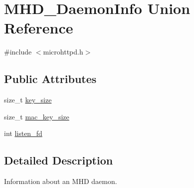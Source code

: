 \hypertarget{unionMHD__DaemonInfo}{\section{\-M\-H\-D\-\_\-\-Daemon\-Info \-Union \-Reference}
\label{unionMHD__DaemonInfo}
}


{\ttfamily \#include $<$microhttpd.\-h$>$}

\subsection*{\-Public \-Attributes}
\begin{DoxyCompactItemize}
\item 
size\-\_\-t \hyperlink{unionMHD__DaemonInfo_aebd8c774d3a7e77d359b0603f4515585}{key\-\_\-size}
\item 
size\-\_\-t \hyperlink{unionMHD__DaemonInfo_a9130cd67f760ff4d092956100bfc86e3}{mac\-\_\-key\-\_\-size}
\item 
int \hyperlink{unionMHD__DaemonInfo_ab1967e0d6ee4ff8cf994459ed8e9f69d}{listen\-\_\-fd}
\end{DoxyCompactItemize}


\subsection{\-Detailed \-Description}
\-Information about an \-M\-H\-D daemon. 

